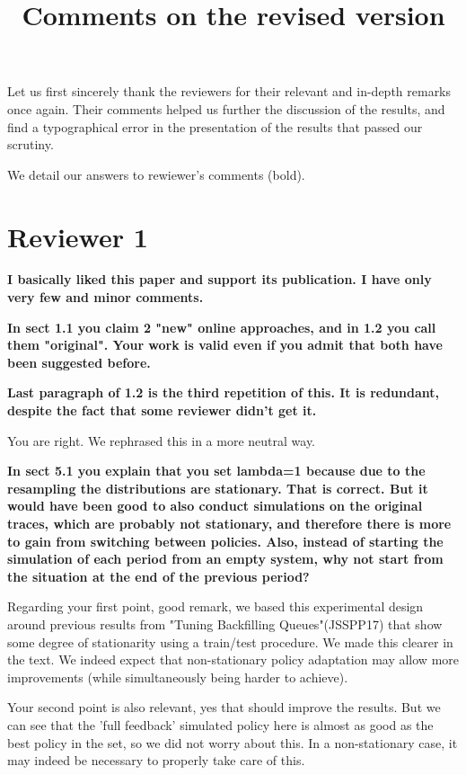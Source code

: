 \documentclass[]{article}
\title{Comments on the revised version}
\begin{document}
\maketitle

Let us first sincerely thank the reviewers for their relevant and in-depth
remarks once again. Their comments helped us further the discussion of the
results, and find a typographical error in the presentation of the results that
passed our scrutiny.

We detail our answers to rewiewer's comments (bold).

\section{Reviewer 1}

\textbf{
  I basically liked this paper and support its publication.  I have only very few and minor comments.}

\textbf{In sect 1.1 you claim 2 "new" online approaches, and in 1.2 you call them "original". Your work is valid even if you
admit that both have been suggested before.
}

\textbf{Last paragraph of 1.2 is the third repetition of this.  It is redundant, despite the fact that some reviewer didn't get
it.
}

You are right. We rephrased this in a more neutral way.

\medskip

\textbf{In sect 5.1 you explain that you set lambda=1 because due to the resampling the distributions are stationary.  That is
correct.  But it would have been good to also conduct simulations on the original traces, which are probably not
stationary, and therefore there is more to gain from switching between policies.
Also, instead of starting the simulation of each period from an empty system, why not start from the situation at the
end of the previous period?
}

Regarding your first point, good remark, we based this experimental design
around previous results from "Tuning Backfilling Queues"(JSSPP17) that show
some degree of stationarity using a train/test procedure. We made this clearer
in the text.
We indeed expect that non-stationary policy adaptation may allow more
improvements (while simultaneously being harder to achieve).

Your second point is also relevant, yes that should improve the results.
But we can see that the 'full feedback' simulated policy here is almost as good as the best
policy in the set, so we did not worry about this. In a non-stationary case, it may indeed
be necessary to properly take care of this.
\end{document}
